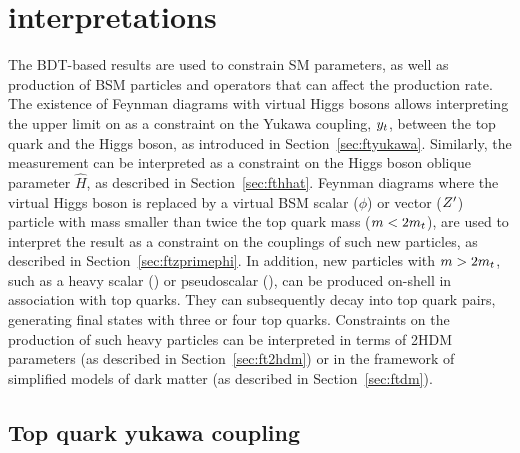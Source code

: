\FloatBarrier

\section{\smft interpretations}
\label{sec:ftinterpretations}

The BDT-based results are used to constrain SM parameters, as well as
production of BSM particles and operators that can affect the \tttt
production rate. The existence of \tttt Feynman diagrams with virtual Higgs
bosons allows interpreting the upper limit on \xsectttt as a constraint on
the Yukawa coupling, $y_{t}$, between the top quark and the Higgs
boson, as introduced in Section~\ref{sec:ftyukawa}. Similarly, the
measurement can be interpreted as a constraint on the Higgs boson oblique
parameter $\hat{H}$, as described in Section~\ref{sec:fthhat}. 
Feynman diagrams
where the virtual Higgs boson is replaced by a virtual BSM scalar ($\phi$) or
vector ($Z^\prime$) particle with mass smaller than twice the top quark mass
($m < 2m_t$), are used to interpret the result as a constraint on the
couplings of such new particles, as described in Section~\ref{sec:ftzprimephi}. 
In addition,
new particles with $m > 2m_t$, such as a heavy scalar (\PH) or
pseudoscalar (\PSA), can be produced on-shell in association with top quarks.
They can subsequently decay into top quark pairs, generating final states
with three or four top quarks. Constraints on the production of such heavy
particles can be interpreted in terms of 2HDM
parameters (as described in Section~\ref{sec:ft2hdm})
or in the framework of simplified models of dark
matter (as described in Section~\ref{sec:ftdm}).

\FloatBarrier

\subsection{Top quark yukawa coupling}

